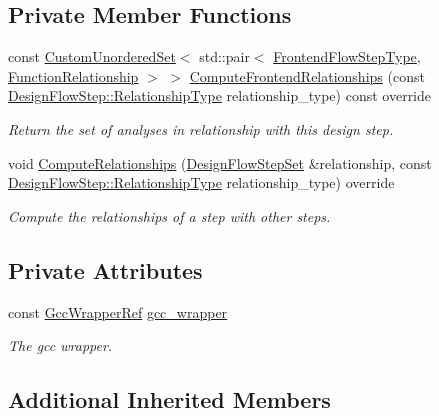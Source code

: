 \subsection*{Private Member Functions}
\begin{DoxyCompactItemize}
\item 
const \hyperlink{classCustomUnorderedSet}{Custom\+Unordered\+Set}$<$ std\+::pair$<$ \hyperlink{frontend__flow__step_8hpp_afeb3716c693d2b2e4ed3e6d04c3b63bb}{Frontend\+Flow\+Step\+Type}, \hyperlink{classFrontendFlowStep_af7cf30f2023e5b99e637dc2058289ab0}{Function\+Relationship} $>$ $>$ \hyperlink{classcreate__tree__manager_a55f84a3d6df3e766409a9c5a0936b6b6}{Compute\+Frontend\+Relationships} (const \hyperlink{classDesignFlowStep_a723a3baf19ff2ceb77bc13e099d0b1b7}{Design\+Flow\+Step\+::\+Relationship\+Type} relationship\+\_\+type) const override
\begin{DoxyCompactList}\small\item\em Return the set of analyses in relationship with this design step. \end{DoxyCompactList}\item 
void \hyperlink{classcreate__tree__manager_ac60f96c1a28f6faf3480e832f071ceb0}{Compute\+Relationships} (\hyperlink{classDesignFlowStepSet}{Design\+Flow\+Step\+Set} \&relationship, const \hyperlink{classDesignFlowStep_a723a3baf19ff2ceb77bc13e099d0b1b7}{Design\+Flow\+Step\+::\+Relationship\+Type} relationship\+\_\+type) override
\begin{DoxyCompactList}\small\item\em Compute the relationships of a step with other steps. \end{DoxyCompactList}\end{DoxyCompactItemize}
\subsection*{Private Attributes}
\begin{DoxyCompactItemize}
\item 
const \hyperlink{gcc__wrapper_8hpp_aba2a317cdd5bc8aa85483a128966782d}{Gcc\+Wrapper\+Ref} \hyperlink{classcreate__tree__manager_a5a04d4b8157ffa3da271d89f0b3d7bfe}{gcc\+\_\+wrapper}
\begin{DoxyCompactList}\small\item\em The gcc wrapper. \end{DoxyCompactList}\end{DoxyCompactItemize}
\subsection*{Additional Inherited Members}


